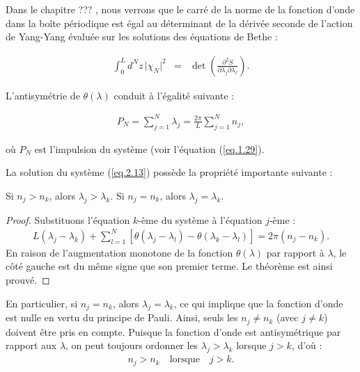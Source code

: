 Dans le chapitre ??? , nous verrons que le carré de la norme de la fonction d'onde dans la boîte périodique est égal au déterminant de la dérivée seconde de l'action de Yang-Yang évaluée sur les solutions des équations de Bethe :

\begin{eqnarray}
	\int_0^L d^N z \, \vert \chi_N \vert^2 & = & \det \left ( \frac{ \partial^2 S}{ \partial \lambda_j \partial \lambda_\ell }  \right ). 
\end{eqnarray}

L'antisymétrie de \( \theta(\lambda) \) conduit à l'égalité suivante :

\begin{eqnarray}
	P_N  = \sum_{j=1}^N \lambda_j = \frac{2 \pi}L \sum_{j=1}^N n_j,		
\end{eqnarray}

où \( P_N \) est l'impulsion du système (voir l'équation (\ref{eq.1.29}).

La solution du système (\ref{eq.2.13}) possède la propriété importante suivante :

\begin{TheoPrinc}
	Si \( n_j > n_k \), alors \( \lambda_j > \lambda_k \). Si \( n_j = n_k \), alors \( \lambda_j = \lambda_k \).
\end{TheoPrinc}

\begin{proof}
	Substituons l'équation \( k \)-ème du système à l'équation \( j \)-ème :
	\begin{eqnarray}
		L(\lambda_j - \lambda_k) + \sum_{l=1}^N \left[ \theta(\lambda_j - \lambda_l) - \theta(\lambda_k - \lambda_l) \right] = 2 \pi (n_j - n_k).
	\end{eqnarray}
	En raison de l'augmentation monotone de la fonction \( \theta(\lambda) \) par rapport à \( \lambda \), le côté gauche est du même signe que son premier terme. Le théorème est ainsi prouvé.
\end{proof}

En particulier, si \( n_j = n_k \), alors \( \lambda_j = \lambda_k \), ce qui implique que la fonction d'onde est nulle en vertu du principe de Pauli. Ainsi, seuls les \( n_j \neq n_k \) (avec \( j \neq k \)) doivent être pris en compte. Puisque la fonction d'onde est antisymétrique par rapport aux \( \lambda \), on peut toujours ordonner les \( \lambda_j > \lambda_k \) lorsque \( j > k \), d'où :
\begin{eqnarray}
	n_j > n_k \quad \text{lorsque} \quad j > k.
\end{eqnarray}

